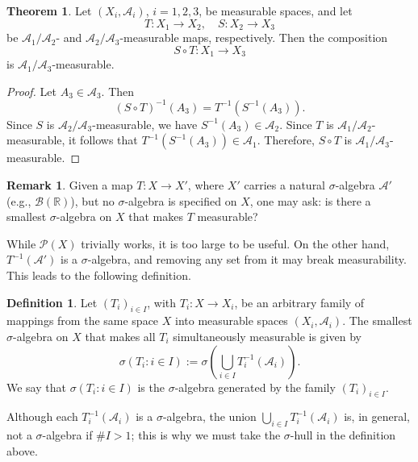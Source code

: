 \documentclass[12pt]{article}
\theoremstyle{definition}
\newtheorem{definition}{Definition}[section]
\newtheorem{theorem}{Theorem}[section]
\newtheorem{remark}{Remark}[section]
\begin{document}
\medskip
\begin{theorem}
Let \( (X_i, \mathcal{A}_i) \), \( i = 1, 2, 3 \), be measurable spaces, and let
\[
T : X_1 \to X_2, \quad S : X_2 \to X_3
\]
be \( \mathcal{A}_1 / \mathcal{A}_2 \)- and \( \mathcal{A}_2 / \mathcal{A}_3 \)-measurable maps, respectively. Then the composition
\[
S \circ T : X_1 \to X_3
\]
is \( \mathcal{A}_1 / \mathcal{A}_3 \)-measurable.
\end{theorem}

\begin{proof}
Let \( A_3 \in \mathcal{A}_3 \). Then
\[
(S \circ T)^{-1}(A_3) = T^{-1}\left(S^{-1}(A_3)\right).
\]
Since \( S \) is \( \mathcal{A}_2 / \mathcal{A}_3 \)-measurable, we have \( S^{-1}(A_3) \in \mathcal{A}_2 \). Since \( T \) is \( \mathcal{A}_1 / \mathcal{A}_2 \)-measurable, it follows that \( T^{-1}(S^{-1}(A_3)) \in \mathcal{A}_1 \). Therefore, \( S \circ T \) is \( \mathcal{A}_1 / \mathcal{A}_3 \)-measurable.
\end{proof}
\medskip

\begin{remark}
Given a map \( T : X \to X' \), where \( X' \) carries a natural \( \sigma \)-algebra \( \mathcal{A}' \) (e.g., \( \mathcal{B}(\mathbb{R}) \)), but no \( \sigma \)-algebra is specified on \( X \), one may ask: is there a smallest \( \sigma \)-algebra on \( X \) that makes \( T \) measurable?

While \( \mathcal{P}(X) \) trivially works, it is too large to be useful. On the other hand, \( T^{-1}(\mathcal{A}') \) is a \( \sigma \)-algebra, and removing any set from it may break measurability. This leads to the following definition.
\end{remark}

\medskip
\begin{definition}
Let \( (T_i)_{i \in I} \), with \( T_i : X \to X_i \), be an arbitrary family of mappings from the same space \( X \) into measurable spaces \( (X_i, \mathcal{A}_i) \). The smallest \( \sigma \)-algebra on \( X \) that makes all \( T_i \) simultaneously measurable is given by
\[
\sigma(T_i : i \in I) := \sigma \left( \bigcup_{i \in I} T_i^{-1}(\mathcal{A}_i) \right).
\]
We say that \( \sigma(T_i : i \in I) \) is the \( \sigma \)-algebra generated by the family \( (T_i)_{i \in I} \).

Although each \( T_i^{-1}(\mathcal{A}_i) \) is a \( \sigma \)-algebra, the union \( \bigcup_{i \in I} T_i^{-1}(\mathcal{A}_i) \) is, in general, not a \( \sigma \)-algebra if \( \# I > 1 \); this is why we must take the \( \sigma \)-hull in the definition above.
\end{definition}
\end{document}
